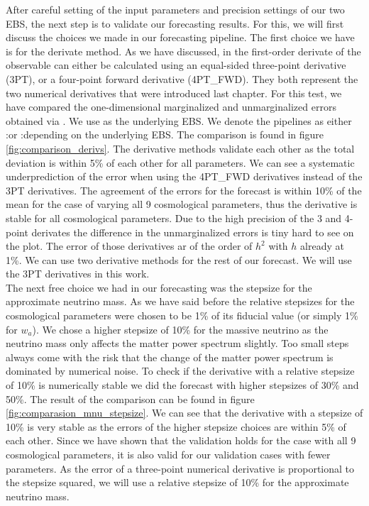 \documentclass[../main.tex]{subfiles}
\begin{document}
After careful setting of the input parameters and precision settings of our two EBS, the next step is to validate our forecasting results. For this, we will first discuss the choices we made in our forecasting pipeline. The first choice we have is for the derivate method. As we have discussed, in \cosmicfish the first-order derivate of the observable can either be calculated using an equal-sided three-point derivative (3PT), or a four-point forward derivative (4PT\_FWD). They both represent the two numerical derivatives that were introduced last chapter. For this test, we have compared the one-dimensional marginalized and unmarginalized errors obtained via \cosmicfish. We use \camb as the underlying EBS. We denote the \cosmicfish pipelines as either \cosmicfish:\camb or \cosmicfish:\class depending on the underlying EBS. The comparison is found in figure \ref{fig:comparison_derivs}. The derivative methods validate each other as the total deviation is within 5\% of each other for all parameters. We can see a systematic underprediction of the error when using the 4PT\_FWD derivatives instead of the 3PT derivatives. The agreement of the errors for the forecast is within 10\% of the mean for the case of varying all 9 cosmological parameters, thus the derivative is stable for all cosmological parameters. Due to the high precision of the 3 and 4-point derivates the difference in the unmarginalized errors is tiny hard to see on the plot. The error of those derivatives ar of the order of $h^2$ with $h$ already at 1\%. We can use two derivative methods for the rest of our forecast. We will use the 3PT derivatives in this work.\\
The next free choice we had in our forecasting was the stepsize for the approximate neutrino mass. As we have said before the relative stepsizes for the cosmological parameters were chosen to be 1\% of its fiducial value (or simply 1\% for $w_a$). We chose a higher stepsize of 10\% for the massive neutrino as the neutrino mass only affects the matter power spectrum slightly. Too small steps always come with the risk that the change of the matter power spectrum is dominated by numerical noise. To check if the derivative with a relative stepsize of 10\% is numerically stable we did the forecast with higher stepsizes of 30\% and 50\%. The result of the comparison can be found in figure \ref{fig:comparasion_mnu_stepsize}. We can see that the derivative with a stepsize of 10\% is very stable as the errors of the higher stepsize choices are within 5\% of each other. Since we have shown that the validation holds for the case with all 9 cosmological parameters, it is also valid for our validation cases with fewer parameters. As the error of a three-point numerical derivative is proportional to the stepsize squared, we will use a relative stepsize of 10\% for the approximate neutrino mass.\\
\end{document}
